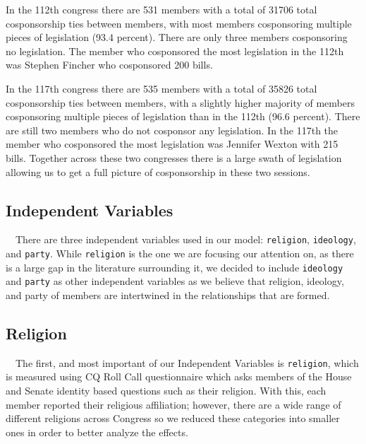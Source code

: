 \documentclass[Royal,times,sageh]{sagej}
\begin{document}
In the 112th congress there are 531 members with a total of 31706 total
cosponsorship ties between members, with most members cosponsoring
multiple pieces of legislation (93.4 percent). There are only three
members cosponsoring no legislation. The member who cosponsored the most
legislation in the 112th was Stephen Fincher who cosponsored 200 bills.

In the 117th congress there are 535 members with a total of 35826 total
cosponsorship ties between members, with a slightly higher majority of
members cosponsoring multiple pieces of legislation than in the 112th
(96.6 percent). There are still two members who do not cosponsor any
legislation. In the 117th the member who cosponsored the most
legislation was Jennifer Wexton with 215 bills. Together across these
two congresses there is a large swath of legislation allowing us to get
a full picture of cosponsorship in these two sessions.

\hypertarget{independent-variables}{%
\subsection{Independent Variables}\label{independent-variables}}

\doublespacing

~~There are three independent variables used in our model:
\texttt{religion}, \texttt{ideology}, and \texttt{party}. While
\texttt{religion} is the one we are focusing our attention on, as there
is a large gap in the literature surrounding it, we decided to include
\texttt{ideology} and \texttt{party} as other independent variables as
we believe that religion, ideology, and party of members are intertwined
in the relationships that are formed.

\hypertarget{religion}{%
\subsection{Religion}\label{religion}}

\doublespacing

~~The first, and most important of our Independent Variables is
\texttt{religion}, which is measured using CQ Roll Call questionnaire
which asks members of the House and Senate identity based questions such
as their religion. With this, each member reported their religious
affiliation; however, there are a wide range of different religions
across Congress so we reduced these categories into smaller ones in
order to better analyze the effects.
\end{document}

